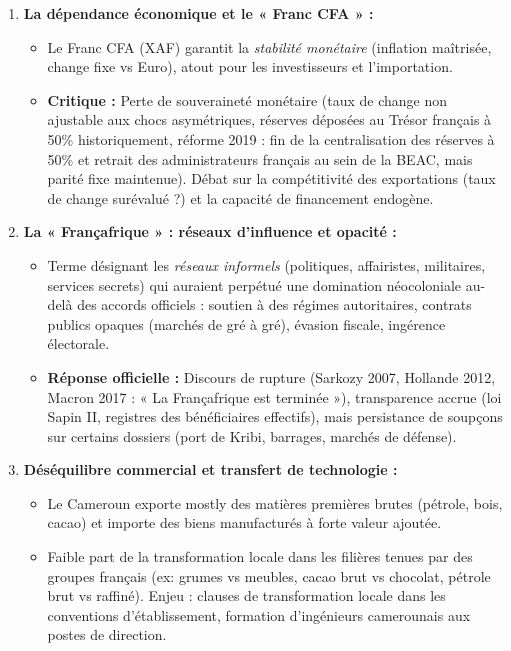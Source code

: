 \documentclass[11pt]{article}
\begin{document}
\begin{aretenir}
\begin{enumerate}
    \item \textbf{La dépendance économique et le « Franc CFA » :}
    \begin{itemize}
        \item Le Franc CFA (XAF) garantit la \emph{stabilité monétaire} (inflation maîtrisée, change fixe vs Euro), atout pour les investisseurs et l'importation.
        \item \textbf{Critique :} Perte de souveraineté monétaire (taux de change non ajustable aux chocs asymétriques, réserves déposées au Trésor français à 50\% historiquement, réforme 2019 : fin de la centralisation des réserves à 50\% et retrait des administrateurs français au sein de la BEAC, mais parité fixe maintenue). Débat sur la compétitivité des exportations (taux de change surévalué ?) et la capacité de financement endogène.
    \end{itemize}
    \item \textbf{La « Françafrique » : réseaux d'influence et opacité :}
    \begin{itemize}
        \item Terme désignant les \emph{réseaux informels} (politiques, affairistes, militaires, services secrets) qui auraient perpétué une domination néocoloniale au-delà des accords officiels : soutien à des régimes autoritaires, contrats publics opaques (marchés de gré à gré), évasion fiscale, ingérence électorale.
        \item \textbf{Réponse officielle :} Discours de rupture (Sarkozy 2007, Hollande 2012, Macron 2017 : « La Françafrique est terminée »), transparence accrue (loi Sapin II, registres des bénéficiaires effectifs), mais persistance de soupçons sur certains dossiers (port de Kribi, barrages, marchés de défense).
    \end{itemize}
    \item \textbf{Déséquilibre commercial et transfert de technologie :}
    \begin{itemize}
        \item Le Cameroun exporte mostly des matières premières brutes (pétrole, bois, cacao) et importe des biens manufacturés à forte valeur ajoutée.
        \item Faible part de la transformation locale dans les filières tenues par des groupes français (ex: grumes vs meubles, cacao brut vs chocolat, pétrole brut vs raffiné). Enjeu : clauses de transformation locale dans les conventions d'établissement, formation d'ingénieurs camerounais aux postes de direction.
    \end{itemize}
\end{enumerate}
\end{aretenir}
\end{document}
